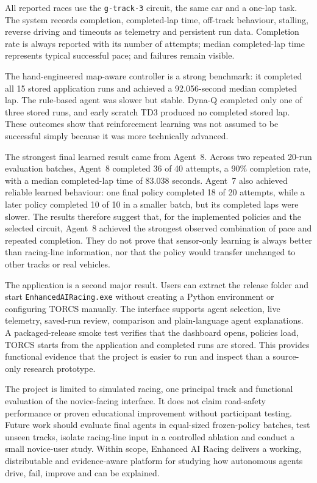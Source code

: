 All reported races use the \texttt{g-track-3} circuit, the same car and a one-lap task. The system records completion, completed-lap time, off-track behaviour, stalling, reverse driving and timeouts as telemetry and persistent run data. Completion rate is always reported with its number of attempts; median completed-lap time represents typical successful pace; and failures remain visible.

The hand-engineered map-aware controller is a strong benchmark: it completed all 15 stored application runs and achieved a 92.056-second median completed lap. The rule-based agent was slower but stable. Dyna-Q completed only one of three stored runs, and early scratch TD3 produced no completed stored lap. These outcomes show that reinforcement learning was not assumed to be successful simply because it was more technically advanced.

The strongest final learned result came from Agent~8. Across two repeated 20-run evaluation batches, Agent~8 completed 36 of 40 attempts, a 90\% completion rate, with a median completed-lap time of 83.038 seconds. Agent~7 also achieved reliable learned behaviour: one final policy completed 18 of 20 attempts, while a later policy completed 10 of 10 in a smaller batch, but its completed laps were slower. The results therefore suggest that, for the implemented policies and the selected circuit, Agent~8 achieved the strongest observed combination of pace and repeated completion. They do not prove that sensor-only learning is always better than racing-line information, nor that the policy would transfer unchanged to other tracks or real vehicles.

The application is a second major result. Users can extract the release folder and start \texttt{EnhancedAIRacing.exe} without creating a Python environment or configuring TORCS manually. The interface supports agent selection, live telemetry, saved-run review, comparison and plain-language agent explanations. A packaged-release smoke test verifies that the dashboard opens, policies load, TORCS starts from the application and completed runs are stored. This provides functional evidence that the project is easier to run and inspect than a source-only research prototype.

The project is limited to simulated racing, one principal track and functional evaluation of the novice-facing interface. It does not claim road-safety performance or proven educational improvement without participant testing. Future work should evaluate final agents in equal-sized frozen-policy batches, test unseen tracks, isolate racing-line input in a controlled ablation and conduct a small novice-user study. Within scope, Enhanced AI Racing delivers a working, distributable and evidence-aware platform for studying how autonomous agents drive, fail, improve and can be explained.


